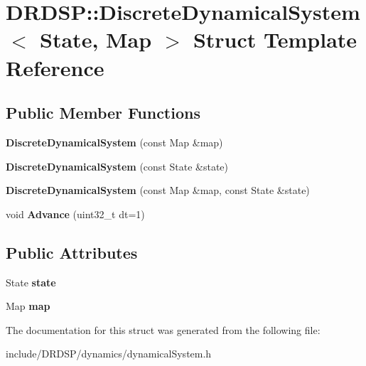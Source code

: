 \hypertarget{struct_d_r_d_s_p_1_1_discrete_dynamical_system}{\section{D\-R\-D\-S\-P\-:\-:Discrete\-Dynamical\-System$<$ State, Map $>$ Struct Template Reference}
\label{struct_d_r_d_s_p_1_1_discrete_dynamical_system}
}
\subsection*{Public Member Functions}
\begin{DoxyCompactItemize}
\item 
\hypertarget{struct_d_r_d_s_p_1_1_discrete_dynamical_system_ad3f73c7a93a088ec169a7c351805abe0}{{\bfseries Discrete\-Dynamical\-System} (const Map \&map)}\label{struct_d_r_d_s_p_1_1_discrete_dynamical_system_ad3f73c7a93a088ec169a7c351805abe0}

\item 
\hypertarget{struct_d_r_d_s_p_1_1_discrete_dynamical_system_a1c0ca0d2f4e25c0f28835141dd1e748f}{{\bfseries Discrete\-Dynamical\-System} (const State \&state)}\label{struct_d_r_d_s_p_1_1_discrete_dynamical_system_a1c0ca0d2f4e25c0f28835141dd1e748f}

\item 
\hypertarget{struct_d_r_d_s_p_1_1_discrete_dynamical_system_afcaaef52db0707cd40b81c23c433d962}{{\bfseries Discrete\-Dynamical\-System} (const Map \&map, const State \&state)}\label{struct_d_r_d_s_p_1_1_discrete_dynamical_system_afcaaef52db0707cd40b81c23c433d962}

\item 
\hypertarget{struct_d_r_d_s_p_1_1_discrete_dynamical_system_ac2e23c5da942cd1f4b484b95ae0075d0}{void {\bfseries Advance} (uint32\-\_\-t dt=1)}\label{struct_d_r_d_s_p_1_1_discrete_dynamical_system_ac2e23c5da942cd1f4b484b95ae0075d0}

\end{DoxyCompactItemize}
\subsection*{Public Attributes}
\begin{DoxyCompactItemize}
\item 
\hypertarget{struct_d_r_d_s_p_1_1_discrete_dynamical_system_a297828d4508bddd152b048cb895daf79}{State {\bfseries state}}\label{struct_d_r_d_s_p_1_1_discrete_dynamical_system_a297828d4508bddd152b048cb895daf79}

\item 
\hypertarget{struct_d_r_d_s_p_1_1_discrete_dynamical_system_ac2e502e92cbdac8d46010d5249ba9de6}{Map {\bfseries map}}\label{struct_d_r_d_s_p_1_1_discrete_dynamical_system_ac2e502e92cbdac8d46010d5249ba9de6}

\end{DoxyCompactItemize}


The documentation for this struct was generated from the following file\-:\begin{DoxyCompactItemize}
\item 
include/\-D\-R\-D\-S\-P/dynamics/dynamical\-System.\-h\end{DoxyCompactItemize}
